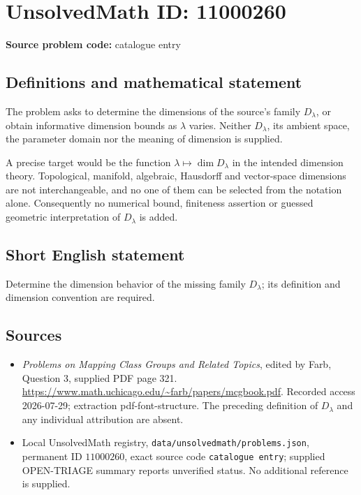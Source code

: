 \documentclass[11pt]{article}
\begin{document}
\section*{UnsolvedMath ID: 11000260}
\textbf{Source problem code:} catalogue entry
\subsection{Definitions and mathematical statement}
The problem asks to determine the dimensions of the source's family \(D_\lambda\), or obtain informative dimension bounds as \(\lambda\) varies. Neither \(D_\lambda\), its ambient space, the parameter domain nor the meaning of dimension is supplied.

A precise target would be the function \(\lambda\mapsto\dim D_\lambda\) in the intended dimension theory. Topological, manifold, algebraic, Hausdorff and vector-space dimensions are not interchangeable, and no one of them can be selected from the notation alone. Consequently no numerical bound, finiteness assertion or guessed geometric interpretation of \(D_\lambda\) is added.
\subsection{Short English statement}
Determine the dimension behavior of the missing family \(D_\lambda\); its definition and dimension convention are required.
\subsection{Sources}
\begin{itemize}
\item \emph{Problems on Mapping Class Groups and Related Topics}, edited by Farb, Question 3, supplied PDF page 321. \url{https://www.math.uchicago.edu/~farb/papers/mcgbook.pdf}. Recorded access 2026-07-29; extraction pdf-font-structure. The preceding definition of \(D_\lambda\) and any individual attribution are absent.
\item Local UnsolvedMath registry, \texttt{data/unsolvedmath/problems.json}, permanent ID \(11000260\), exact source code \texttt{catalogue entry}; supplied OPEN-TRIAGE summary reports unverified status. No additional reference is supplied.
\end{itemize}
\end{document}
